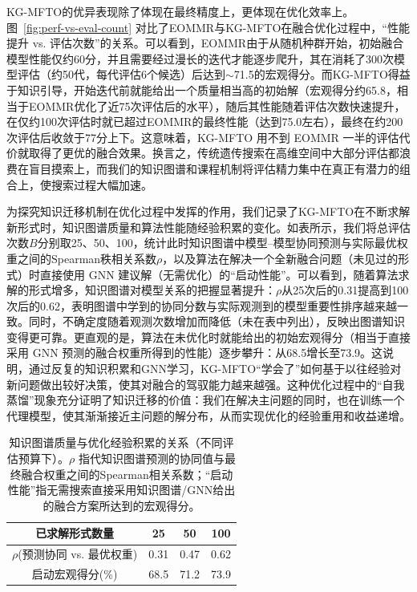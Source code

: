 \documentclass[../main.tex]{subfiles}
\begin{document}
KG-MFTO的优异表现除了体现在最终精度上，更体现在优化效率上。图~\ref{fig:perf-vs-eval-count} 对比了EOMMR与KG-MFTO在融合优化过程中，“性能提升 vs. 评估次数”的关系。可以看到，EOMMR由于从随机种群开始，初始融合模型性能仅约60分，并且需要经过漫长的迭代才能逐步爬升，其在消耗了300次模型评估（约50代，每代评估6个候选）后达到$\sim$71.5的宏观得分。而KG-MFTO得益于知识引导，开始迭代前就能给出一个质量相当高的初始解（宏观得分约65.8，相当于EOMMR优化了近75次评估后的水平），随后其性能随着评估次数快速提升，在仅约100次评估时就已超过EOMMR的最终性能（达到75.0左右），最终在约200次评估后收敛于77分上下。这意味着，KG-MFTO 用不到 EOMMR 一半的评估代价就取得了更优的融合效果。换言之，传统遗传搜索在高维空间中大部分评估都浪费在盲目摸索上，而我们的知识图谱和课程机制将评估精力集中在真正有潜力的组合上，使搜索过程大幅加速。


为探究知识迁移机制在优化过程中发挥的作用，我们记录了KG-MFTO在不断求解新形式时，知识图谱质量和算法性能随经验积累的变化。如表所示，我们将总评估次数$B$分别取25、50、100，统计此时知识图谱中模型--模型协同预测与实际最优权重之间的Spearman秩相关系数$\rho$，以及算法在解决一个全新融合问题（未见过的形式）时直接使用 GNN 建议解（无需优化）的“启动性能”。可以看到，随着算法求解的形式增多，知识图谱对模型关系的把握显著提升：$\rho$从25次后的0.31提高到100次后的0.62，表明图谱中学到的协同分数与实际观测到的模型重要性排序越来越一致。同时，不确定度随着观测次数增加而降低（未在表中列出），反映出图谱知识变得更可靠。更直观的是，算法在未优化时就能给出的初始宏观得分（相当于直接采用 GNN 预测的融合权重所得到的性能）逐步攀升：从68.5增长至73.9。这说明，通过反复的知识积累和GNN学习，KG-MFTO“学会了”如何基于以往经验对新问题做出较好决策，使其对融合的驾驭能力越来越强。这种优化过程中的“自我蒸馏”现象充分证明了知识迁移的价值：我们在解决主问题的同时，也在训练一个代理模型，使其渐渐接近主问题的解分布，从而实现优化的经验重用和收益递增。

\begin{table}[tb]
	\centering
	\caption{知识图谱质量与优化经验积累的关系（不同评估预算下）。$\rho$ 指代知识图谱预测的协同值与最终融合权重之间的Spearman相关系数；“启动性能”指无需搜索直接采用知识图谱/GNN给出的融合方案所达到的宏观得分。}
	\label{tab:kg-quality}
	\small\begin{tabular}{cccc}
		\toprule
		\textbf{已求解形式数量}      & 25   & 50   & 100  \\
		\midrule
		$\rho$(预测协同 vs. 最优权重) & 0.31 & 0.47 & 0.62 \\
		启动宏观得分(\%)            & 68.5 & 71.2 & 73.9 \\
		\bottomrule
	\end{tabular}
\end{table}
\end{document}
